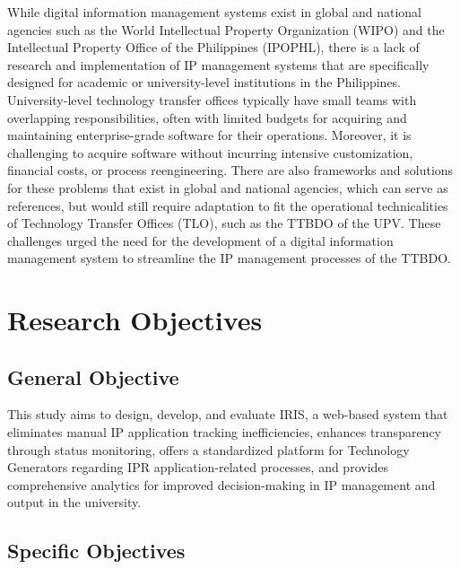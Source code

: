 While digital information management systems exist in global and national agencies such as the World Intellectual Property Organization (WIPO) and the Intellectual Property Office of the Philippines (IPOPHL), there is a lack of research and implementation of IP management systems that are specifically designed for academic or university-level institutions in the Philippines. University-level technology transfer offices typically have small teams with overlapping responsibilities, often with limited budgets for acquiring and maintaining enterprise-grade software for their operations. Moreover, it is challenging to acquire software without incurring intensive customization, financial costs, or process reengineering. There are also frameworks and solutions for these problems that exist in global and national agencies, which can serve as references, but would still require adaptation to fit the operational technicalities of Technology Transfer Offices (TLO), such as the TTBDO of the UPV. These challenges urged the need for the development of a digital information management system to streamline the IP management processes of the TTBDO.

\section{Research Objectives}

\subsection{General Objective}

This study aims to design, develop, and evaluate IRIS, a web-based system that eliminates manual IP application tracking inefficiencies, enhances transparency through status monitoring, offers a standardized platform for Technology Generators regarding IPR application-related processes, and provides comprehensive analytics for improved decision-making in IP management and output in the university.


\subsection{Specific Objectives}

